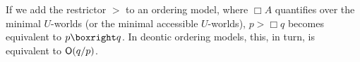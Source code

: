 If we add the restrictor $>$ to an ordering model, where $\Box A$ quantifies
over the minimal $U$-worlds (or the minimal accessible $U$-worlds), $p > \Box q$
becomes equivalent to $p \boxright q$. In deontic ordering models, this, in
turn, is equivalent to $\operatorname{\mathsf{O}}(q/p)$.



\fi

